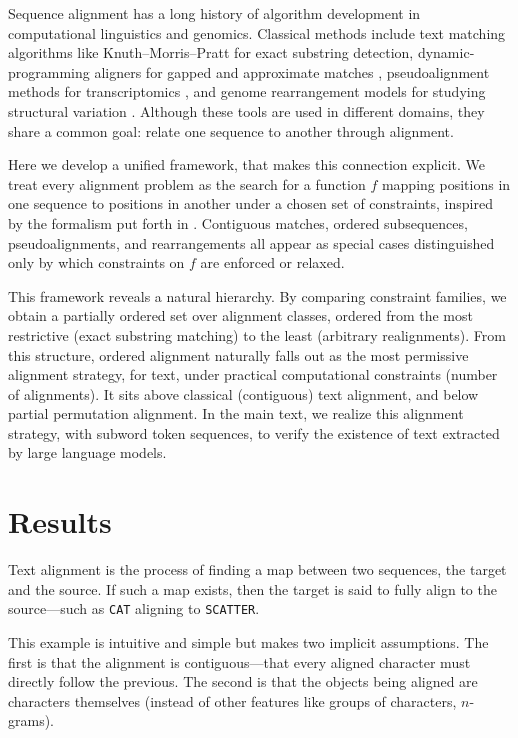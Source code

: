 Sequence alignment has a long history of algorithm development in computational linguistics and genomics. Classical methods include text matching algorithms like Knuth–Morris–Pratt \citep{KnuthMorrisPratt1977} for exact substring detection, dynamic-programming aligners for gapped and approximate matches \citep{needlemanwunsch1970, smithwaterman1981}, pseudoalignment methods for transcriptomics \citep{Bray2016kallisto}, and genome rearrangement models for studying structural variation \citep{hannenhallipevzner1999permutations, tesler2002grimm}. Although these tools are used in different domains, they share a common goal: relate one sequence to another through alignment.

Here we develop a unified framework, that makes this connection explicit. We treat every alignment problem as the search for a function $f$ mapping positions in one sequence to positions in another under a chosen set of constraints, inspired by the formalism put forth in \citep{schwartz2007seqanneal}. Contiguous matches, ordered subsequences, pseudoalignments, and rearrangements all appear as special cases distinguished only by which constraints on $f$ are enforced or relaxed.

This framework reveals a natural hierarchy. By comparing constraint families, we obtain a partially ordered set over alignment classes, ordered from the most restrictive (exact substring matching) to the least (arbitrary realignments). From this structure, ordered alignment naturally falls out as the most permissive alignment strategy, for text, under practical computational constraints (number of alignments). It sits above classical (contiguous) text alignment, and below partial permutation alignment. In the main text, we realize this alignment strategy, with subword token sequences, to verify the existence of text extracted by large language models.

\section{Results}
Text alignment is the process of finding a map between two sequences, the target and the source. If such a map exists, then the target is said to fully align to the source---such as \texttt{CAT} aligning to \texttt{SCATTER}.

This example is intuitive and simple but makes two implicit assumptions. The first is that the alignment is contiguous---that every aligned character must directly follow the previous. The second is that the objects being aligned are characters themselves (instead of other features like groups of characters, $n$-grams).

